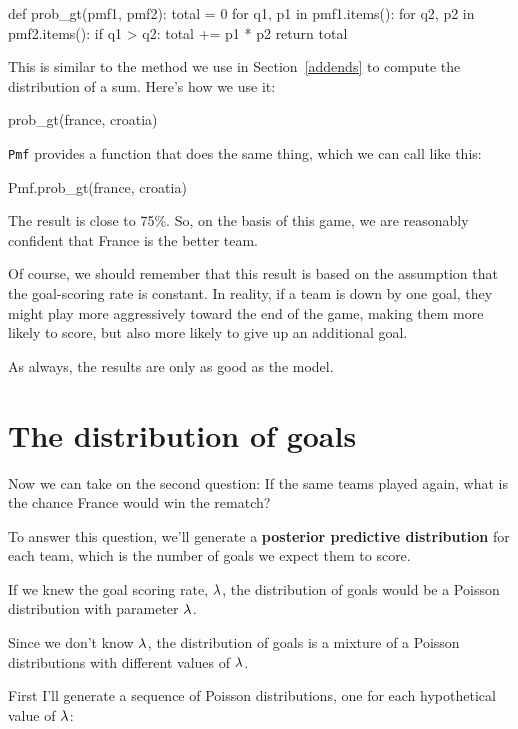 \documentclass[12pt]{book}
\theoremstyle{exercise}
\newcommand{\py}[1]{{\tt #1}}%
\begin{document}
\begin{code}
def prob_gt(pmf1, pmf2):
    total = 0
    for q1, p1 in pmf1.items():
        for q2, p2 in pmf2.items():
            if q1 > q2:
                total += p1 * p2
    return total
\end{code}

This is similar to the method we use in Section~\ref{addends} to compute the distribution of a sum.
Here's how we use it:

\begin{code}
prob_gt(france, croatia)
\end{code}

\py{Pmf} provides a function that does the same thing, which we can call like this:

\begin{code}
Pmf.prob_gt(france, croatia)
\end{code}

The result is close to 75\%.  So, on the basis of this game, we are reasonably confident that France is the better team.

Of course, we should remember that this result is based on the assumption that the goal-scoring rate is constant.
In reality, if a team is down by one goal, they might play more aggressively toward the end of the game, making them more likely to score, but also more likely to give up an additional goal.

As always, the results are only as good as the model.


\section{The distribution of goals}

Now we can take on the second question: If the same teams played again, what is the chance France would win the rematch?

To answer this question, we'll generate a {\bf posterior predictive distribution} for each team, which is the number of goals we expect them to score.

If we knew the goal scoring rate, $\mathtt{\lambda}$, the distribution of goals would be a Poisson distribution with parameter $\mathtt{\lambda}$.

Since we don't know $\mathtt{\lambda}$, the distribution of goals is a mixture of a Poisson distributions with different values of $\mathtt{\lambda}$.

First I'll generate a sequence of Poisson distributions, one for each hypothetical value of $\mathtt{\lambda}$:
\end{document}
